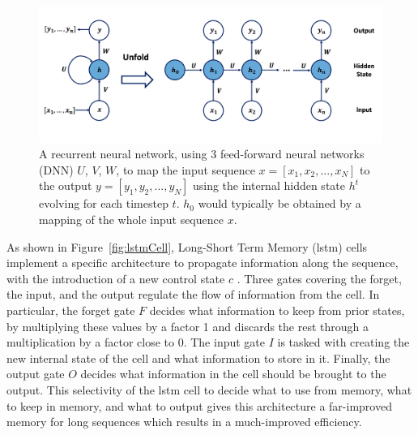 \begin{figure}[h!]
    \center
    \includegraphics[scale=0.5]{Images/ML/rnn.png}
    \caption{A recurrent neural network, using 3 feed-forward neural networks (DNN) $U$, $V$, $W$, to map the input sequence $x = [x_1, x_2, ..., x_N]$ to the output $y = [y_1, y_2, ..., y_N]$ using the internal hidden state $h^t$ evolving for each timestep $t$. $h_0$ would typically be obtained by a mapping of the whole input sequence $x$. } 
    \label{fig:rnnNet}
\end{figure}

As shown in Figure~\ref{fig:lstmCell}, Long-Short Term Memory (\gls{lstm}) cells implement a specific architecture to propagate information along the sequence, with the introduction of a new control state $c$ \cite{lstmPaper}. Three gates covering the forget, the input, and the output regulate the flow of information from the cell. In particular, the forget gate $F$ decides what information to keep from prior states, by multiplying these values by a factor 1 and discards the rest through a multiplication by a factor close to 0. The input gate $I$ is tasked with creating the new internal state of the cell and what information to store in it. Finally, the output gate $O$ decides what information in the cell should be brought to the output. This selectivity of the \gls{lstm} cell to decide what to use from memory, what to keep in memory, and what to output gives this architecture a far-improved memory for long sequences which results in a much-improved efficiency. 

